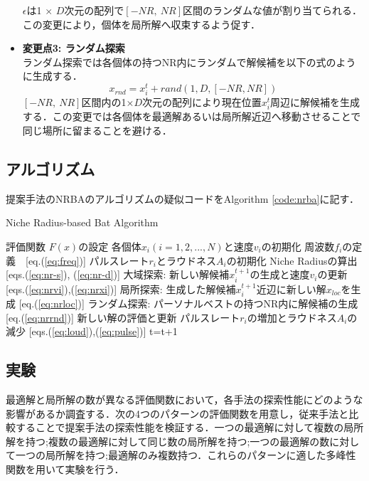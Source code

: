 \documentclass[a4j,11pt]{jarticle}
\begin{document}
\begin{itemize}
$\epsilon$は1 $\times$ $D$次元の配列で$[-NR, \ NR]$区間のランダムな値が割り当てられる．この変更により，個体を局所解へ収束するよう促す．
\item {\bf 変更点3: ランダム探索} \\
ランダム探索では各個体の持つNR内にランダムで解候補を以下の式のように生成する．
\begin{equation}
\label{eq:nrrnd}
x_{rnd}=x_i^t + rand(1,D,[-NR, NR])
\end{equation}
$[-NR, \ NR]$区間内の1×$D$次元の配列により現在位置$x_i^t$周辺に解候補を生成する．この変更では各個体を最適解あるいは局所解近辺へ移動させることで同じ場所に留まることを避ける．
\end{itemize}

\subsection{アルゴリズム}
\label{ss:NRBA-algorithm}
提案手法のNRBAのアルゴリズムの疑似コードをAlgorithm \ref{code:nrba}に記す．
\begin{algorithm}[H]
\caption{Niche Radius-based Bat Algorithm}
\label{code:nrba}
\begin{algorithmic}[7]
\REQUIRE 評価関数 $F(x)$の設定
\STATE 各個体$x_i(i=1,2,...,N)$と速度$v_i$の初期化
\STATE 周波数$f_i$の定義　[eq.(\ref{eq:freq})]
\STATE パルスレート$r_i$とラウドネス$A_i$の初期化
\STATE Niche Radiusの算出 [eqs.(\ref{eq:nr-s}), (\ref{eq:nr-d})]
\STATE 大域探索: 新しい解候補$x_i^{t+1}$の生成と速度$v_i$の更新 [eqs.(\ref{eq:nrvi}),(\ref{eq:nrxi})]
\ENDIF
{}
\STATE 局所探索: 生成した解候補$x_i^{t+1}$近辺に新しい解$x_{loc}$を生成 [eq.(\ref{eq:nrloc})]
\ENDIF
\STATE ランダム探索: パーソナルベストの持つNR内に解候補の生成 [eq.(\ref{eq:nrrnd})]
\STATE 新しい解の評価と更新
\STATE パルスレート$r_i$の増加とラウドネス$A_i$の減少 [eqs.(\ref{eq:loud}),(\ref{eq:pulse})]
\ENDIF
\ENDFOR
\STATE t=t+1
\ENDWHILE
\end{algorithmic}
\end{algorithm}

\subsection{実験}
\label{ss:NRBA-exp}
最適解と局所解の数が異なる評価関数において，各手法の探索性能にどのような影響があるか調査する．次の4つのパターンの評価関数を用意し，従来手法と比較することで提案手法の探索性能を検証する．一つの最適解に対して複数の局所解を持つ;複数の最適解に対して同じ数の局所解を持つ;一つの最適解の数に対して一つの局所解を持つ;最適解のみ複数持つ．これらのパターンに適した多峰性関数を用いて実験を行う．
\end{document}
